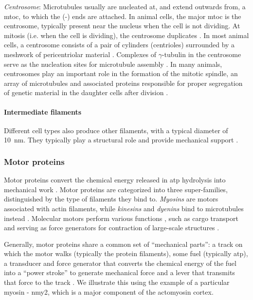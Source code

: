 \textit{Centrosome}: Microtubules usually are nucleated at, and extend outwards from, a \ac{mtoc}, to which the (-) ends are attached. In animal cells, the major \ac{mtoc} is the centrosome, typically present near the nucleus when the cell is not dividing. At mitosis (i.e. when the cell is dividing), the centrosome duplicates \citep{chaffey2003alberts}. In most animal cells, a centrosome consists of a pair of cylinders (centrioles) surrounded by a meshwork of pericentriolar material \citep{pimenta2020pericentriolar}. Complexes of $\gamma$-tubulin in the centrosome serve as the nucleation sites for microtubule assembly \citep{kellogg1994centrosome}. In many animals, centrosomes play an important role in the formation of the mitotic spindle, an array of microtubules and associated proteins responsible for proper segregation of genetic material in the daughter cells after division \citep{bettencourt2013q,chaffey2003alberts}.

\paragraph{Intermediate filaments}
Different cell types also produce other filaments, with a typical diameter of \SI{10}{\nano\meter}. They typically play a structural role and provide mechanical support \citep{chaffey2003alberts,herrmann2007intermediate}.

\subsubsection{Motor proteins}\label{subsubsec:MotorCytoskeleton}
Motor proteins convert the chemical energy released in \ac{atp} hydrolysis into mechanical work \citep{chaffey2003alberts,bray2001cell,kolomeisky2007molecular,howard2002mechanics}. Motor proteins are categorized into three super-families, distinguished by the type of filaments they bind to. \textit{Myosins} are motors associated with actin filaments, while \textit{kinesins} and \textit{dyenins} bind to microtubules instead \citep{chaffey2003alberts}. Molecular motors perform various functions \citep{chaffey2003alberts}, such as cargo transport \citep{vale2003molecular} and serving as force generators for contraction of large-scale structures \citep{howard2002mechanics,carlsson2006contractile}.

Generally, motor proteins share a common set of \enquote{mechanical parts}: a track on which the motor walks (typically the protein filaments), some fuel (typically \ac{atp}), a transducer and force generator that converts the chemical energy of the fuel into a \enquote{power stroke} to generate mechanical force and a lever that transmits that force to the track \citep{hwang2009mechanical}. We illustrate this using the example of a particular myosin - \acs{nmy2}, which is a major component of the actomyosin cortex. 

